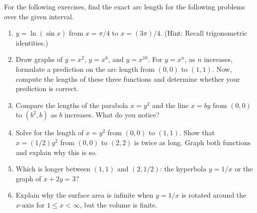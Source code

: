 \documentclass{exercises}
\begin{document}
For the following exercises, find the exact arc length for the following problems over the given interval.

\begin{enumerate}[resume]
\item $y=\ln(\sin x)$ from $x=\pi/4$ to $x=(3\pi)/4$. (Hint: Recall trigonometric identities.)
\item \techrequired Draw graphs of $y=x^{2}$, $y=x^{6}$, and $y=x^{10}$. For $y=x^{n}$, as $n$ increases, formulate a prediction on the arc length from $(0,0)$ to $(1,1)$. Now, compute the lengths of these three functions and determine whether your prediction is correct.
\item Compare the lengths of the parabola $x=y^{2}$ and the line $x=by$ from $(0,0)$ to $(b^{2},b)$ as $b$ increases. What do you notice?
\item Solve for the length of $x=y^{2}$ from $(0,0)$ to $(1,1)$. Show that $x=(1/2)y^{2}$ from $(0,0)$ to $(2,2)$ is twice as long. Graph both functions and explain why this is so.
\item \techrequired Which is longer between $(1,1)$ and $(2,1/2)$: the hyperbola $y=1/x$ or the graph of $x+2y=3$?
\item Explain why the surface area is infinite when $y=1/x$ is rotated around the $x\text{-axis}$ for $1\le x<\infty$, but the volume is finite.
\end{enumerate}
\end{document}
